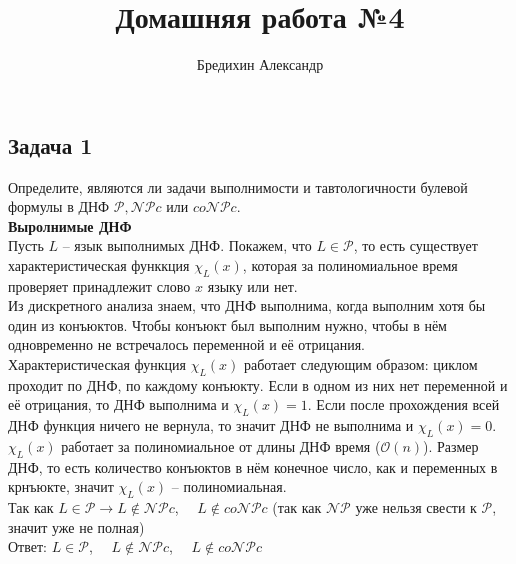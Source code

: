\documentclass[a4paper,12pt]{article} %
\author{Бредихин Александр}
\title{Домашняя работа №4}
\begin{document}
\maketitle
\subsection*{Задача 1}
Определите, являются ли задачи выполнимости и тавтологичности булевой формулы в ДНФ $\mathcal{P}, \mathcal{NP}c$ или $co\mathcal{NP}c$. \smallskip \\

{\bf Выролнимые ДНФ} \\
Пусть $ L $ -- язык выполнимых ДНФ. Покажем, что $ L\in \mathcal{P} $, то есть существует характеристическая функкция $\chi_L(x)$, которая за полиномиальное время проверяет принадлежит слово $ x $ языку или нет.\\
Из дискретного анализа знаем, что ДНФ выполнима, когда выполним хотя бы один из конъюктов. Чтобы конъюкт был выполним нужно, чтобы в нём одновременно не встречалось переменной и её отрицания.\\
Характеристическая функция $\chi_L(x)$ работает следующим образом: циклом проходит по ДНФ, по каждому конъюкту. Если в одном из них нет переменной и её отрицания, то ДНФ выполнима и $\chi_L(x) = 1$. Если после прохождения всей ДНФ функция ничего не вернула, то значит ДНФ не выполнима и $\chi_L(x) = 0$.\\
$\chi_L(x)$ работает за полиномиальное от длины ДНФ время ($\mathcal{O}(n)$). Размер ДНФ, то есть количество конъюктов в нём конечное число, как и переменных в крнъюкте, значит $\chi_L(x)$ -- полиномиальная.\\
Так как $ L\in \mathcal{P} \longrightarrow L \notin \mathcal{NP}c$, $\quad L \notin co\mathcal{NP}c$ (так как $ \mathcal{NP} $ уже нельзя свести к  $ \mathcal{P} $, значит уже не полная)\\
Ответ: $ L\in \mathcal{P}$, $ \quad L \notin \mathcal{NP}c$, $\quad L \notin co\mathcal{NP}c$\\
\end{document}
